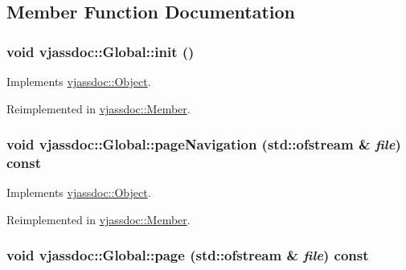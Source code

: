 \subsection{Member Function Documentation}
\hypertarget{classvjassdoc_1_1Global_9e6189cfd577f0453988e8c8c6eec04d}{
\subsubsection{\setlength{\rightskip}{0pt plus 5cm}void vjassdoc::Global::init ()}}
\label{classvjassdoc_1_1Global_9e6189cfd577f0453988e8c8c6eec04d}




Implements \hyperlink{classvjassdoc_1_1Object_bd43e77dbe80055f5adda67661dfaca4}{vjassdoc::Object}.

Reimplemented in \hyperlink{classvjassdoc_1_1Member_eccac74ca5ea37e82d322c20b5aa2efc}{vjassdoc::Member}.\hypertarget{classvjassdoc_1_1Global_8c5209b5652d3633feb1d7fab796b439}{
\subsubsection{\setlength{\rightskip}{0pt plus 5cm}void vjassdoc::Global::pageNavigation (std::ofstream \& {\em file}) const}}
\label{classvjassdoc_1_1Global_8c5209b5652d3633feb1d7fab796b439}




Implements \hyperlink{classvjassdoc_1_1Object_736bbb6719edd8070d8f56c364a2764c}{vjassdoc::Object}.

Reimplemented in \hyperlink{classvjassdoc_1_1Member_fa8e020175714b1f03a3696cc935941f}{vjassdoc::Member}.\hypertarget{classvjassdoc_1_1Global_1b8fefe2b9c895c122a822bac0383f1b}{
\subsubsection{\setlength{\rightskip}{0pt plus 5cm}void vjassdoc::Global::page (std::ofstream \& {\em file}) const}}
\label{classvjassdoc_1_1Global_1b8fefe2b9c895c122a822bac0383f1b}




